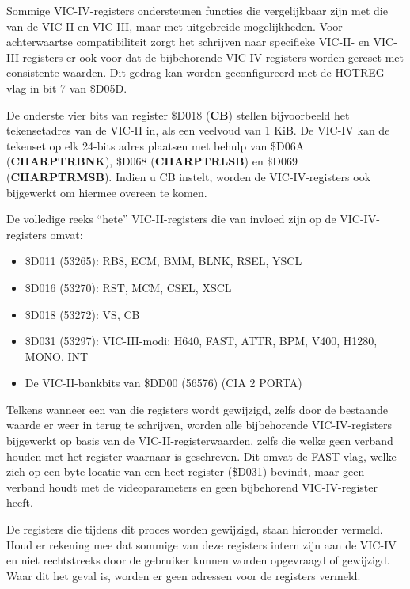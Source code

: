 Sommige VIC-IV-registers ondersteunen functies die vergelijkbaar zijn met die van de VIC-II en VIC-III, maar met uitgebreide mogelijkheden. Voor achterwaartse compatibiliteit zorgt het schrijven naar specifieke VIC-II- en VIC-III-registers er ook voor dat de bijbehorende VIC-IV-registers worden gereset met consistente waarden. Dit gedrag kan worden geconfigureerd met de HOTREG-vlag in bit 7 van \$D05D.

De onderste vier bits van register \$D018 (\textbf{CB}) stellen bijvoorbeeld het tekensetadres van de VIC-II in, als een veelvoud van 1 KiB. De VIC-IV kan de tekenset op elk 24-bits adres plaatsen met behulp van \$D06A (\textbf{CHARPTRBNK}), \$D068 (\textbf{CHARPTRLSB}) en \$D069 (\textbf{CHARPTRMSB}). Indien u CB instelt, worden de VIC-IV-registers ook bijgewerkt om hiermee overeen te komen.

De volledige reeks ``hete'' VIC-II-registers die van invloed zijn op de VIC-IV-registers omvat:

\begin{itemize}
\item \$D011 (53265): RB8, ECM, BMM, BLNK, RSEL, YSCL\item \$D016 (53270): RST, MCM, CSEL, XSCL\item \$D018 (53272): VS, CB\item \$D031 (53297): VIC-III-modi: H640, FAST, ATTR, BPM, V400, H1280, MONO, INT\item De VIC-II-bankbits van \$DD00 (56576) (CIA 2 PORTA)
\end{itemize}

Telkens wanneer een van die registers wordt gewijzigd, zelfs door de bestaande waarde er weer in terug te schrijven, worden alle bijbehorende VIC-IV-registers bijgewerkt op basis van de VIC-II-registerwaarden, zelfs die welke geen verband houden met het register waarnaar is geschreven. Dit omvat de FAST-vlag, welke zich op een byte-locatie van een heet register (\$D031) bevindt, maar geen verband houdt met de videoparameters en geen bijbehorend VIC-IV-register heeft.

De registers die tijdens dit proces worden gewijzigd, staan hieronder vermeld. Houd er rekening mee dat sommige van deze registers intern zijn aan de VIC-IV en niet rechtstreeks door de gebruiker kunnen worden opgevraagd of gewijzigd. Waar dit het geval is, worden er geen adressen voor de registers vermeld.

